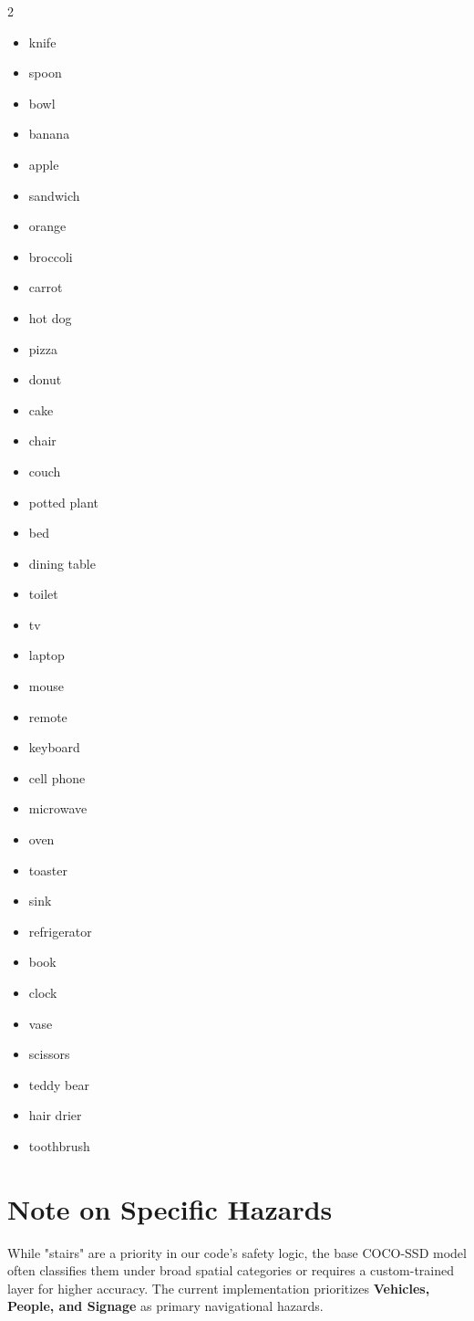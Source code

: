 \documentclass[12pt]{article}
\begin{document}
\begin{multicols}{2}
\begin{itemize}
    \item knife
    \item spoon
    \item bowl
    \item banana
    \item apple
    \item sandwich
    \item orange
    \item broccoli
    \item carrot
    \item hot dog
    \item pizza
    \item donut
    \item cake
    \item chair
    \item couch
    \item potted plant
    \item bed
    \item dining table
    \item toilet
    \item tv
    \item laptop
    \item mouse
    \item remote
    \item keyboard
    \item cell phone
    \item microwave
    \item oven
    \item toaster
    \item sink
    \item refrigerator
    \item book
    \item clock
    \item vase
    \item scissors
    \item teddy bear
    \item hair drier
    \item toothbrush
\end{itemize}
\end{multicols}

\section*{Note on Specific Hazards}
While "stairs" are a priority in our code's safety logic, the base COCO-SSD model often classifies them under broad spatial categories or requires a custom-trained layer for higher accuracy. The current implementation prioritizes \textbf{Vehicles, People, and Signage} as primary navigational hazards.
\end{document}
